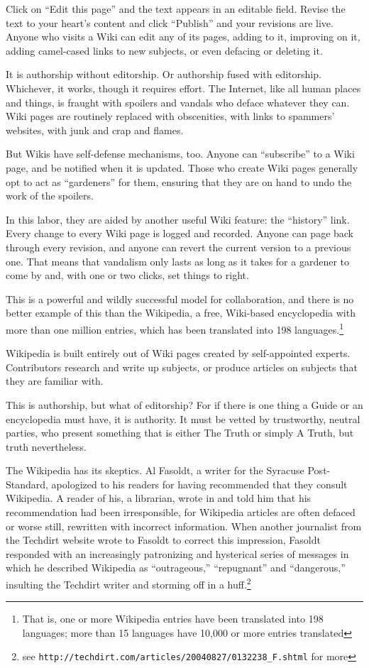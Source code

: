 Click on ``Edit this page'' and the text appears in an editable
field. Revise the text to your heart's content and click ``Publish''
and your revisions are live. Anyone who visits a Wiki can edit any
of its pages, adding to it, improving on it, adding camel-cased
links to new subjects, or even defacing or deleting it.

It is authorship without editorship. Or authorship fused with
editorship. Whichever, it works, though it requires effort. The
Internet, like all human places and things, is fraught with
spoilers and vandals who deface whatever they can. Wiki pages are
routinely replaced with obscenities, with links to spammers'
websites, with junk and crap and flames.

But Wikis have self-defense mechanisms, too. Anyone can ``subscribe''
to a Wiki page, and be notified when it is updated. Those who
create Wiki pages generally opt to act as ``gardeners'' for them,
ensuring that they are on hand to undo the work of the spoilers.

In this labor, they are aided by another useful Wiki feature: the
``history'' link. Every change to every Wiki page is logged and
recorded. Anyone can page back through every revision, and anyone
can revert the current version to a previous one. That means that
vandalism only lasts as long as it takes for a gardener to come by
and, with one or two clicks, set things to right.

This is a powerful and wildly successful model for collaboration,
and there is no better example of this than the Wikipedia, a free,
Wiki-based encyclopedia with more than one million entries, which
has been translated into 198 languages.\footnote{That is, one or more
Wikipedia entries have been translated into 198 languages; more
than 15 languages have 10,000 or more entries translated}

Wikipedia is built entirely out of Wiki pages created by
self-appointed experts. Contributors research and write up
subjects, or produce articles on subjects that they are familiar
with.

This is authorship, but what of editorship? For if there is one
thing a Guide or an encyclopedia must have, it is authority. It
must be vetted by trustworthy, neutral parties, who present
something that is either The Truth or simply A Truth, but truth
nevertheless.

The Wikipedia has its skeptics. Al Fasoldt, a writer for the
Syracuse Post-Standard, apologized to his readers for having
recommended that they consult Wikipedia. A reader of his, a
librarian, wrote in and told him that his recommendation had been
irresponsible, for Wikipedia articles are often defaced or worse
still, rewritten with incorrect information. When another
journalist from the Techdirt website wrote to Fasoldt to correct
this impression, Fasoldt responded with an increasingly patronizing
and hysterical series of messages in which he described Wikipedia
as ``outrageous,'' ``repugnant'' and ``dangerous,'' insulting the
Techdirt writer and storming off in a huff.\footnote{see
\texttt{http://techdirt.com/articles/20040827/0132238\_F.shtml}
for more}

